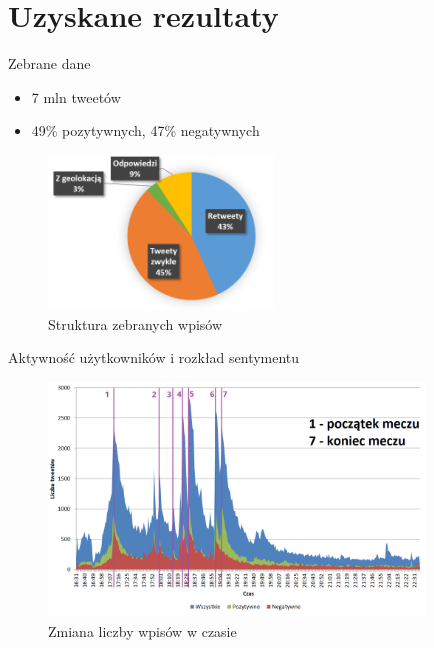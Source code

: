 \documentclass[xcolor=table]{beamer}
\begin{document}
\section{Uzyskane rezultaty}
\begin{frame}{Zebrane dane}
\begin{itemize}
  \item 7 mln tweetów  
  \item 49\% pozytywnych, 47\% negatywnych
\end{itemize}

\begin{figure}[ht!]
\centering
\includegraphics[width=6cm]{img/rozklad-wpisow2.png}
\caption{Struktura zebranych wpisów}
\end{figure}
\end{frame}

\begin{frame}{Aktywność użytkowników i rozkład sentymentu}

\begin{figure}[ht!]
\centering
\includegraphics[width=10cm]{img/tweety-w-meczu-nums2.png}
\caption{Zmiana liczby wpisów w czasie}
\end{figure}
 
\end{frame} 
\end{document}
